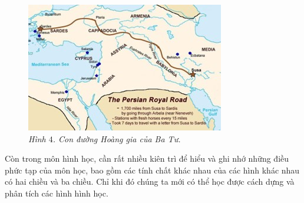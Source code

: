 \begin{multicols}{2}
\begin{figure}[H]
		\includegraphics[width= 1\linewidth]{3}
		\caption{\small\textit{\color{quantoan}Hình $4$. Con đường Hoàng gia của Ba Tư.}}
		\vspace*{-10pt}
	\end{figure}
	Còn trong môn hình học, cần rất nhiều kiên trì để hiểu và ghi nhớ những điều phức tạp của môn học, bao gồm các tính chất khác nhau của các hình khác nhau có hai chiều và ba chiều. Chỉ khi đó chúng ta mới có thể học được cách dựng và phân tích các hình hình học.
\end{multicols}
